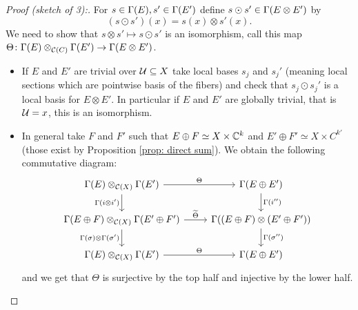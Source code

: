 \begin{proof}[Proof (sketch of 3):]
 For $s\in\Gamma(E),s'\in\Gamma(E')$ define $s\odot s'\in\Gamma(E\otimes E')$ by $$(s\odot s')(x)=s(x)\otimes s'(x).$$ We need to show that $s\otimes s'\mapsto s\odot s'$ is an isomorphism, call this map $\Theta\colon \Gamma(E)\otimes_{\mathcal{C}(C)}\Gamma(E')\to\Gamma(E\otimes E')$.
 
 \begin{itemize}
  \item If $E$ and $E'$ are trivial over $\mathcal{U}\subseteq X$ take local bases $s_j$ and $s_j'$ (meaning local sections which are pointwise basis of the fibers) and check that $s_j\odot s_j'$ is a local basis for $E\otimes E'$. In particular if $E$ and $E'$ are globally trivial, that is $\mathcal{U}=x$, this is an isomorphism.
  \item In general take $F$ and $F'$ such that $E\oplus F\simeq X\times\mathbb{C}^k$ and $E'\oplus F'\simeq X\times C^{k'}$ (those exist by Proposition \eqref{prop: direct sum}). We obtain the following commutative diagram:
  $$\begin{tikzcd}
    \G(E)\otimes_{\Co(X)}\G(E') \arrow["\Theta",r] \arrow["\G(i\otimes i')"',d] & \G(E\oplus E') \arrow["\G(i'')",d] \\
    \G(E\oplus F)\otimes_{\Co(X)}\G(E'\oplus F') \arrow["\widetilde{\Theta}",r] \arrow["\G(\sigma)\otimes\G(\sigma')"',d] & \G((E\oplus F)\otimes(E'\oplus F'))\arrow["\G(\sigma'')",d] \\
    \G(E)\otimes_{\Co(X)}\G(E') \arrow["\Theta",r]  & \G(E\oplus E')
    \end{tikzcd}
 $$
 and we get that $\Theta$ is surjective by the top half and injective by the lower half.
 \end{itemize}
\end{proof}

